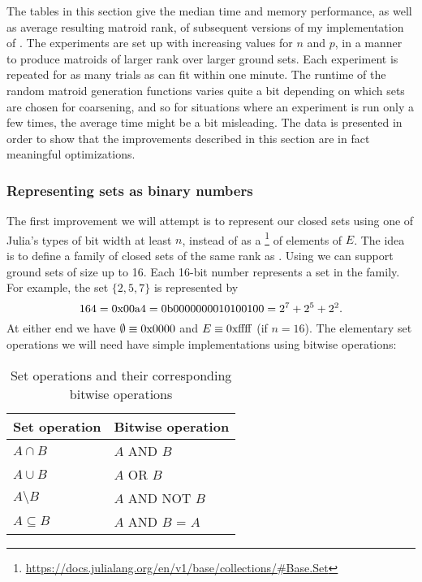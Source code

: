 The tables in this section give the median time and memory performance, as well as average resulting matroid rank, of subsequent versions of my implementation of . The experiments are set up with increasing values for $n$ and $p$, in a manner to produce matroids of larger rank over larger ground sets. Each experiment is repeated for as many trials as can fit within one minute. The runtime of the random matroid generation functions varies quite a bit depending on which sets are chosen for coarsening, and so for situations where an experiment is run only a few times, the average time might be a bit misleading. The data is presented in order to show that the improvements described in this section are in fact meaningful optimizations.

\subsubsection{Representing sets as binary numbers}
The first improvement we will attempt is to represent our closed sets using one of Julia's  types of bit width at least $n$, instead of as a \footnote{\href{https://docs.julialang.org/en/v1/base/collections/\#Base.Set}{https://docs.julialang.org/en/v1/base/collections/\#Base.Set}} of elements of $E$. The idea is to define a family of closed sets of the same rank as . Using  we can support ground sets of size up to 16. Each 16-bit number represents a set in the family. For example, the set $\{ 2,5,7 \}$ is represented by $$164 = 0\rm{x}00\rm{a}4 = 0\rm{b}0000000010100100 = 2^7+2^5+2^2.$$ At either end we have $\emptyset \equiv 0\rm{x}0000$ and $E \equiv 0\rm{xffff}$ (if $n = 16$). The elementary set operations we will need have simple implementations using bitwise operations:

\begin{table}
  \centering
  \begin{tabular}{|l|l|}
  \hline
      Set operation & Bitwise operation \\\hline
      $A \cap B$      & $A$ AND $B$ \\\hline
      $A \cup B$      & $A$ OR $B$ \\\hline
      $A \setminus B$ & $A$ AND NOT $B$ \\\hline
      $A \subseteq B$ & $A$ AND $B$ = $A$ \\\hline
  \end{tabular}
  \caption{Set operations and their corresponding bitwise operations}
\end{table}

